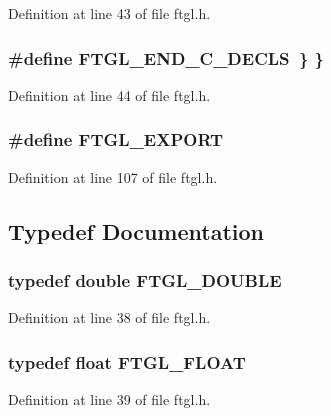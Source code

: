 Definition at line 43 of file ftgl.h.

\subsubsection[{FTGL\_\-END\_\-C\_\-DECLS}]{\setlength{\rightskip}{0pt plus 5cm}\#define FTGL\_\-END\_\-C\_\-DECLS~\} \}}\label{ftgl_8h_aba8b33a81b5c655eb7c4b358419a17d5}


Definition at line 44 of file ftgl.h.

\subsubsection[{FTGL\_\-EXPORT}]{\setlength{\rightskip}{0pt plus 5cm}\#define FTGL\_\-EXPORT}\label{ftgl_8h_ae472b08d77a4ead09abe74fe37220270}


Definition at line 107 of file ftgl.h.



\subsection{Typedef Documentation}
\subsubsection[{FTGL\_\-DOUBLE}]{\setlength{\rightskip}{0pt plus 5cm}typedef double {\bf FTGL\_\-DOUBLE}}\label{ftgl_8h_ae792fb2619b3890381a8b68babbdac74}


Definition at line 38 of file ftgl.h.

\subsubsection[{FTGL\_\-FLOAT}]{\setlength{\rightskip}{0pt plus 5cm}typedef float {\bf FTGL\_\-FLOAT}}\label{ftgl_8h_ad08e479bb6a0dbe611100e8549d55a1b}


Definition at line 39 of file ftgl.h.

